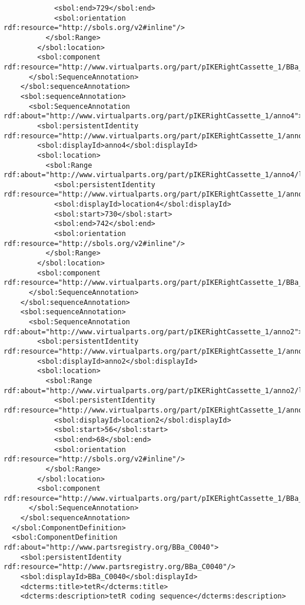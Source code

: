 \begin{lstlisting}
            <sbol:end>729</sbol:end>
            <sbol:orientation rdf:resource="http://sbols.org/v2#inline"/>
          </sbol:Range>
        </sbol:location>
        <sbol:component rdf:resource="http://www.virtualparts.org/part/pIKERightCassette_1/BBa_C0040"/>
      </sbol:SequenceAnnotation>
    </sbol:sequenceAnnotation>
    <sbol:sequenceAnnotation>
      <sbol:SequenceAnnotation rdf:about="http://www.virtualparts.org/part/pIKERightCassette_1/anno4">
        <sbol:persistentIdentity rdf:resource="http://www.virtualparts.org/part/pIKERightCassette_1/anno4"/>
        <sbol:displayId>anno4</sbol:displayId>
        <sbol:location>
          <sbol:Range rdf:about="http://www.virtualparts.org/part/pIKERightCassette_1/anno4/location4">
            <sbol:persistentIdentity rdf:resource="http://www.virtualparts.org/part/pIKERightCassette_1/anno4/location4"/>
            <sbol:displayId>location4</sbol:displayId>
            <sbol:start>730</sbol:start>
            <sbol:end>742</sbol:end>
            <sbol:orientation rdf:resource="http://sbols.org/v2#inline"/>
          </sbol:Range>
        </sbol:location>
        <sbol:component rdf:resource="http://www.virtualparts.org/part/pIKERightCassette_1/BBa_J61130"/>
      </sbol:SequenceAnnotation>
    </sbol:sequenceAnnotation>
    <sbol:sequenceAnnotation>
      <sbol:SequenceAnnotation rdf:about="http://www.virtualparts.org/part/pIKERightCassette_1/anno2">
        <sbol:persistentIdentity rdf:resource="http://www.virtualparts.org/part/pIKERightCassette_1/anno2"/>
        <sbol:displayId>anno2</sbol:displayId>
        <sbol:location>
          <sbol:Range rdf:about="http://www.virtualparts.org/part/pIKERightCassette_1/anno2/location2">
            <sbol:persistentIdentity rdf:resource="http://www.virtualparts.org/part/pIKERightCassette_1/anno2/location2"/>
            <sbol:displayId>location2</sbol:displayId>
            <sbol:start>56</sbol:start>
            <sbol:end>68</sbol:end>
            <sbol:orientation rdf:resource="http://sbols.org/v2#inline"/>
          </sbol:Range>
        </sbol:location>
        <sbol:component rdf:resource="http://www.virtualparts.org/part/pIKERightCassette_1/BBa_J61120"/>
      </sbol:SequenceAnnotation>
    </sbol:sequenceAnnotation>
  </sbol:ComponentDefinition>
  <sbol:ComponentDefinition rdf:about="http://www.partsregistry.org/BBa_C0040">
    <sbol:persistentIdentity rdf:resource="http://www.partsregistry.org/BBa_C0040"/>
    <sbol:displayId>BBa_C0040</sbol:displayId>
    <dcterms:title>tetR</dcterms:title>
    <dcterms:description>tetR coding sequence</dcterms:description>

\end{lstlisting}
